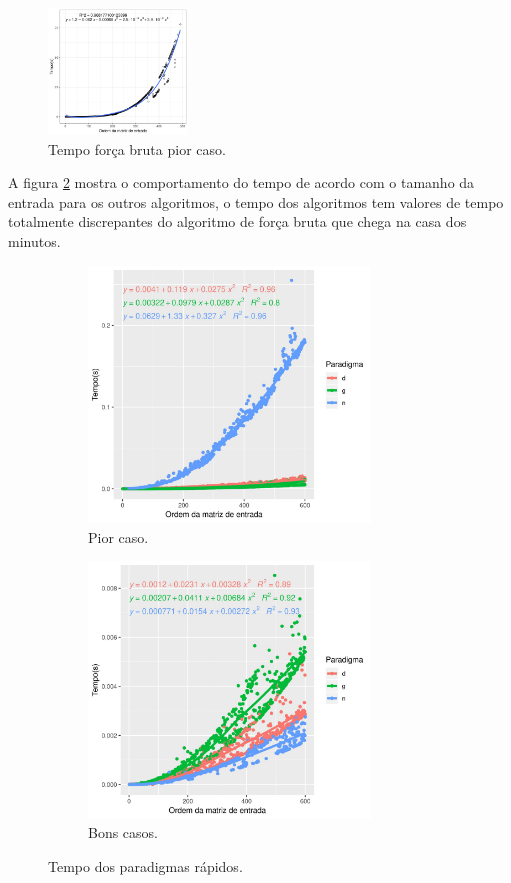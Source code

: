 \documentclass[10.9pt]{article}
\begin{document}
\begin{figure}[htbp]
\centering
\includegraphics[width=0.33\textwidth]{forcabruta.jpg}
\caption{Tempo força bruta pior caso.\label{fig:forcabruta}}
\end{figure}

A figura \ref{fig:tempo-total} mostra o comportamento do tempo de acordo com o tamanho da entrada para os outros algoritmos, o tempo dos algoritmos tem valores de tempo totalmente discrepantes do algoritmo de força bruta que chega na casa dos minutos.
\begin{center}
\begin{figure}
\begin{subfigure}[b]{.49\linewidth}
\centering
\includegraphics[width=7.5cm]{tempo-total}
\caption{Pior caso.}\label{fig:tempo-total}
\end{subfigure}
\begin{subfigure}[b]{.49\linewidth}
\centering
\includegraphics[width=7.5cm]{tempo-best}
\caption{Bons casos.}\label{fig:tempo-best}
\end{subfigure}
\caption{Tempo dos paradigmas rápidos.}
\end{figure}
\end{center}
\end{document}
